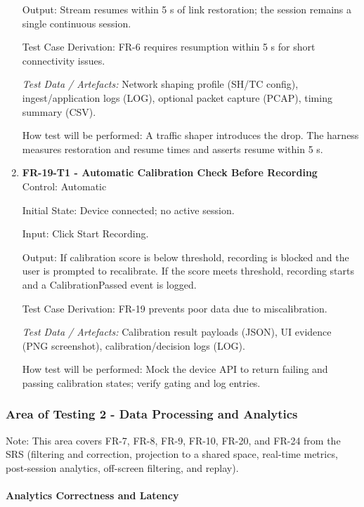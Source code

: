 \documentclass[12pt, titlepage]{article}
\begin{document}
\begin{enumerate}
Output: Stream resumes within 5 s of link restoration; the session remains a single continuous session.

Test Case Derivation: FR-6 requires resumption within 5 s for short connectivity issues.

\textit{Test Data / Artefacts:} Network shaping profile (SH/TC config), ingest/application logs (LOG), optional packet capture (PCAP), timing summary (CSV).

How test will be performed: A traffic shaper introduces the drop. The harness measures restoration and resume times and asserts resume within 5 s.

\item \textbf{FR-19-T1 - Automatic Calibration Check Before Recording} \\

Control: Automatic

Initial State: Device connected; no active session.

Input: Click Start Recording.

Output: If calibration score is below threshold, recording is blocked and the user is prompted to recalibrate. If the score meets threshold, recording starts and a CalibrationPassed event is logged.

Test Case Derivation: FR-19 prevents poor data due to miscalibration.

\textit{Test Data / Artefacts:} Calibration result payloads (JSON), UI evidence (PNG screenshot), calibration/decision logs (LOG).

How test will be performed: Mock the device API to return failing and passing calibration states; verify gating and log entries.

\end{enumerate}


\subsubsection{Area of Testing 2 - Data Processing and Analytics}

Note: This area covers FR-7, FR-8, FR-9, FR-10, FR-20, and FR-24 from the SRS (filtering and correction, projection to a shared space, real-time metrics, post-session analytics, off-screen filtering, and replay).

\paragraph{Analytics Correctness and Latency}
\end{document}
